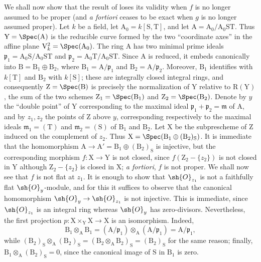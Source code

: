 \begin{env}[11.7.2]
\label{IV.11.7.2}
We shall now show that the result of  loses its validity when $f$ is no longer assumed to be proper (and \emph{a fortiori}  ceases to be exact when $g$ is no longer assumed proper).
Let $k$ be a field, let $\mathrm{A}_0=k[\mathrm{S},\mathrm{T}]$, and let $\mathrm{A}=\mathrm{A}_0/\mathrm{A}_0\mathrm{S}\mathrm{T}$. Thus $\mathrm{Y}=\Spec(\mathrm{A})$ is the reducible curve formed by the two ``coordinate axes'' in the affine plane $\mathrm{V}_k^2=\Spec(\mathrm{A}_0)$.
The ring $\mathrm{A}$ has two minimal prime ideals $\mathfrak{p}_1=\mathrm{A}_0\mathrm{S}/\mathrm{A}_0\mathrm{S}\mathrm{T}$ and $\mathfrak{p}_2=\mathrm{A}_0\mathrm{T}/\mathrm{A}_0\mathrm{S}\mathrm{T}$. Since $\mathrm{A}$ is reduced, it embeds canonically into $\mathrm{B}=\mathrm{B}_1\oplus\mathrm{B}_2$, where $\mathrm{B}_1=\mathrm{A}/\mathfrak{p}_1$ and $\mathrm{B}_2=\mathrm{A}/\mathfrak{p}_2$. Moreover, $\mathrm{B}_1$ identifies with $k[\mathrm{T}]$ and $\mathrm{B}_2$ with $k[\mathrm{S}]$; these are integrally closed integral rings, and consequently $\mathrm{Z}=\Spec(\mathrm{B})$ is precisely the normalization of $\mathrm{Y}$ relative to $\mathrm{R}(\mathrm{Y})$ , the sum of the two schemes $\mathrm{Z}_1=\Spec(\mathrm{B}_1)$ and $\mathrm{Z}_2=\Spec(\mathrm{B}_2)$.
Denote by $y$ the ``double point'' of $\mathrm{Y}$ corresponding to the maximal ideal $\mathfrak{p}_1+\mathfrak{p}_2=\mathfrak{m}$ of $\mathrm{A}$, and by $z_1,z_2$ the points of $\mathrm{Z}$ above $y$, corresponding respectively to the maximal ideals $\mathfrak{m}_1=(\mathrm{T})$ and $\mathfrak{m}_2=(\mathrm{S})$ of $\mathrm{B}_1$ and $\mathrm{B}_2$.
Let $\mathrm{X}$ be the subprescheme of $\mathrm{Z}$ induced on the complement of $z_2$. Thus $\mathrm{X}=\Spec(\mathrm{B}_1\oplus(\mathrm{B}_2)_\mathrm{S})$. It is immediate that the homomorphism $\mathrm{A}\to\mathrm{A}'=\mathrm{B}_1\oplus(\mathrm{B}_2)_\mathrm{S}$ is injective, but the corresponding morphism $f:\mathrm{X}\to\mathrm{Y}$ is not closed, since $f(\mathrm{Z}_2-\{z_2\})$ is not closed in $\mathrm{Y}$ although $\mathrm{Z}_2-\{z_2\}$ is closed in $\mathrm{X}$; \emph{a fortiori}, $f$ is not proper.
We shall now see that $f$ is not flat at $z_1$. It is enough to show  that $\sh{O}_{z_1}$ is not a faithfully flat $\sh{O}_y$-module, and for this it suffices to observe that the canonical homomorphism $\sh{O}_y\to\sh{O}_{z_1}$ is not injective. This is immediate, since $\sh{O}_{z_1}$ is an integral ring whereas $\sh{O}_y$ has zero-divisors.
Nevertheless, the first projection $p:\mathrm{X}\times_\mathrm{Y}\mathrm{X}\to\mathrm{X}$ is an isomorphism. Indeed,
\[
\mathrm{B}_1\otimes_\mathrm{A}\mathrm{B}_1
=(\mathrm{A}/\mathfrak{p}_1)\otimes_\mathrm{A}(\mathrm{A}/\mathfrak{p}_1)
=\mathrm{A}/\mathfrak{p}_1,
\]
while $(\mathrm{B}_2)_\mathrm{S}\otimes_\mathrm{A}(\mathrm{B}_2)_\mathrm{S}=(\mathrm{B}_2\otimes_\mathrm{A}\mathrm{B}_2)_\mathrm{S}=(\mathrm{B}_2)_\mathrm{S}$ for the same reason; finally, $\mathrm{B}_1\otimes_\mathrm{A}(\mathrm{B}_2)_\mathrm{S}=0$, since the canonical image of $\mathrm{S}$ in $\mathrm{B}_1$ is zero.
\end{env}

